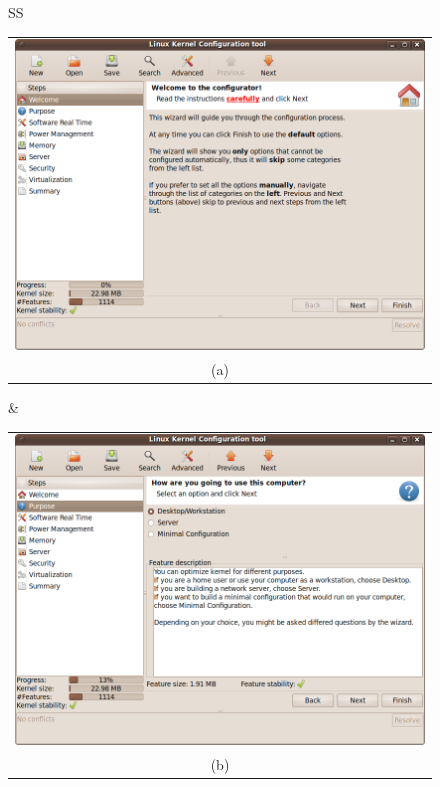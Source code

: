\documentclass{chi2009}
\begin{document}
\begin{figure}[!t]
 \centering
 \begin{tabular}{SS}
 \begin{tabular}{c}
  \includegraphics[scale=0.25,keepaspectratio=true]{figs/lkc-final1} \\
  (a) \\
 \end{tabular}
  & 
\begin{tabular}{c}
  \includegraphics[scale=0.25,keepaspectratio=true]{figs/lkc-final2} \\
  (b) \\
 \end{tabular} \\

\end{tabular}
\end{figure}
\end{document}
